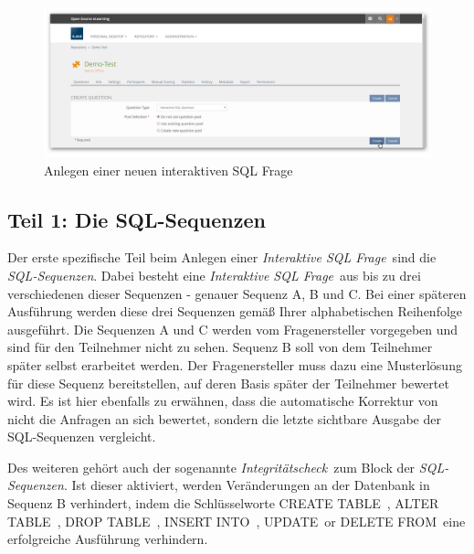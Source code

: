    \begin{figure}[H]
        \begin{center}
            \includegraphics[page=1, width=0.7\paperwidth, trim=4 4 4 4, clip]{fig/Create-Question.png} 
            \caption{Anlegen einer neuen interaktiven SQL Frage}
            \label{fig:create-question}
        \end{center}
    \end{figure}
    
\subsection{Teil 1: Die SQL-Sequenzen}

    Der erste  spezifische Teil beim Anlegen einer \glqq\textit{Interaktive SQL Frage}\grqq\ sind die \glqq\textit{SQL-Sequenzen}\grqq . Dabei besteht eine \glqq\textit{Interaktive SQL Frage}\grqq\ aus bis zu drei verschiedenen dieser Sequenzen - genauer Sequenz A, B und C. Bei einer späteren Ausführung werden diese drei Sequenzen gemäß Ihrer alphabetischen Reihenfolge ausgeführt. Die Sequenzen A und C werden vom Fragenersteller vorgegeben und sind für den Teilnehmer nicht zu sehen. Sequenz B soll von dem Teilnehmer später selbst erarbeitet werden. Der Fragenersteller muss dazu eine Musterlösung für diese Sequenz bereitstellen, auf deren Basis später der Teilnehmer bewertet wird. Es ist hier ebenfalls zu erwähnen, dass die automatische Korrektur von  nicht die Anfragen an sich bewertet, sondern die letzte sichtbare Ausgabe der SQL-Sequenzen vergleicht.
    
    Des weiteren gehört auch der sogenannte \glqq\textit{Integritätscheck}\grqq\ zum Block der \glqq\textit{SQL-Sequenzen}\grqq . Ist dieser aktiviert, werden Veränderungen an der Datenbank in Sequenz B verhindert, indem die Schlüsselworte \glqq CREATE TABLE\grqq\ , \glqq ALTER TABLE\grqq\ , \glqq DROP TABLE\grqq\ , \glqq INSERT INTO\grqq\ , \glqq UPDATE\grqq\  or \glqq DELETE FROM\grqq\ eine erfolgreiche Ausführung verhindern.
    
